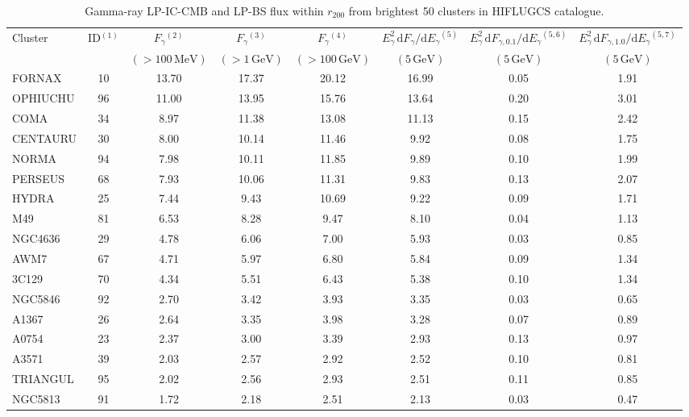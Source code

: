 \documentclass[10pt,aps,pra,reprint,amsmath,amsfonts,amssymb,showpacs,nofootinbib,floatfix]{revtex4-1}
\newcommand{\rmn}{\mathrm}
\newcommand{\dd}{\rmn{d}}
\newcommand{\rvir}{r_{200}}
\newcommand{\eg}{E_\gamma}
\begin{document}
\begin{table}
\begin{minipage}{2.0\columnwidth}
  \caption{Gamma-ray LP-IC-CMB and LP-BS flux within $\rvir$ from brightest 50 clusters in HIFLUGCS catalogue.}
\begin{tabular}{l  c c c c c c c}
\hline
\hline
 Cluster & ID$^{(1)}$ & $F_{\gamma}$$^{(2)}$ & $F_{\gamma}$$^{(3)}$& 
 $F_{\gamma}$$^{(4)}$ & $\eg^2\,\dd F_{\gamma}/\dd \eg$$^{(5)}$ &
 $\eg^2\,\dd F_{\gamma,0.1}/\dd \eg$$^{(5,6)}$ & 
 $\eg^2\,\dd F_{\gamma,1.0}/\dd \eg$$^{(5,7)}$\\
  & & $(>100\,\rmn{MeV})$ & $(>1\,\rmn{GeV})$ & $(>100\,\rmn{GeV})$ & 
 $(5\,\rmn{GeV})$ & $(5\,\rmn{GeV})$ &  $(5\,\rmn{GeV})$\\
 \hline
FORNAX   &  10 &  13.70 &  17.37 &  20.12 &  16.99 &   0.05 &   1.91 \\
OPHIUCHU &  96 &  11.00 &  13.95 &  15.76 &  13.64 &   0.20 &   3.01 \\
COMA     &  34 &   8.97 &  11.38 &  13.08 &  11.13 &   0.15 &   2.42 \\
CENTAURU &  30 &   8.00 &  10.14 &  11.46 &   9.92 &   0.08 &   1.75 \\
NORMA    &  94 &   7.98 &  10.11 &  11.85 &   9.89 &   0.10 &   1.99 \\
PERSEUS  &  68 &   7.93 &  10.06 &  11.31 &   9.83 &   0.13 &   2.07 \\
HYDRA    &  25 &   7.44 &   9.43 &  10.69 &   9.22 &   0.09 &   1.71 \\
M49      &  81 &   6.53 &   8.28 &   9.47 &   8.10 &   0.04 &   1.13 \\
NGC4636  &  29 &   4.78 &   6.06 &   7.00 &   5.93 &   0.03 &   0.85 \\
AWM7     &  67 &   4.71 &   5.97 &   6.80 &   5.84 &   0.09 &   1.34 \\
3C129    &  70 &   4.34 &   5.51 &   6.43 &   5.38 &   0.10 &   1.34 \\
NGC5846  &  92 &   2.70 &   3.42 &   3.93 &   3.35 &   0.03 &   0.65 \\
A1367    &  26 &   2.64 &   3.35 &   3.98 &   3.28 &   0.07 &   0.89 \\
A0754    &  23 &   2.37 &   3.00 &   3.39 &   2.93 &   0.13 &   0.97 \\
A3571    &  39 &   2.03 &   2.57 &   2.92 &   2.52 &   0.10 &   0.81 \\
TRIANGUL &  95 &   2.02 &   2.56 &   2.93 &   2.51 &   0.11 &   0.85 \\
NGC5813  &  91 &   1.72 &   2.18 &   2.51 &   2.13 &   0.03 &   0.47 \\

\end{tabular}
\end{minipage}
\end{table}
\end{document}
